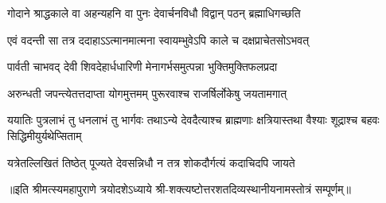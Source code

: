 \twolineshloka
{गोदाने श्राद्धकाले वा अहन्यहनि वा पुनः}
{देवार्चनविधौ विद्वान् पठन् ब्रह्माधिगच्छति}

\twolineshloka
{एवं वदन्ती सा तत्र ददाहाऽऽत्मानमात्मना}
{स्वायम्भुवेऽपि काले च दक्षप्राचेतसोऽभवत्}

\twolineshloka
{पार्वती चाभवद् देवी शिवदेहार्धधारिणी}
{मेनागर्भसमुत्पन्ना भुक्तिमुक्तिफलप्रदा}

\twolineshloka
{अरुन्धती जपन्त्येतत्तदाप्ता योगमुत्तमम्}
{पुरूरवाश्च राजर्षिर्लोकेषु जयतामगात्}

\threelineshloka
{ययातिः पुत्रलाभं तु धनलाभं तु भार्गवः}
{तथाऽन्ये देवदैत्याश्च ब्राह्मणाः क्षत्रियास्तथा}
{वैश्याः शूद्राश्च बहवः सिद्धिमीयुर्यथेप्सिताम्}

\twolineshloka
{यत्रेतल्लिखितं तिष्ठेत् पूज्यते देवसन्निधौ}
{न तत्र शोकदौर्गत्यं कदाचिदपि जायते}

॥इति श्रीमत्स्यमहापुराणे त्रयोदशेऽध्याये श्री-शक्त्यष्टोत्तरशतदिव्यस्थानीयनामस्तोत्रं सम्पूर्णम्॥